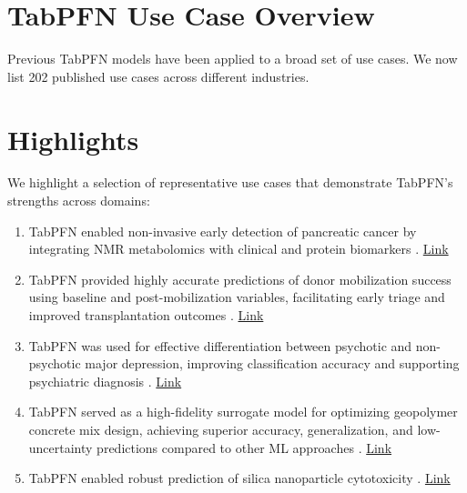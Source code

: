 \section{TabPFN Use Case Overview}\label{app:use_cases}

Previous TabPFN models have been applied to a broad set of use cases. We now list 202 published use cases across different industries.

\section*{Highlights}

We highlight a selection of representative use cases that demonstrate TabPFN's strengths across domains:
\begin{enumerate}

\item TabPFN enabled non-invasive early detection of pancreatic cancer by integrating NMR metabolomics with clinical and protein biomarkers \cite{wu2026panmetai}.  \href{https://www.nature.com/articles/s41467-026-69426-9}{Link}



\item TabPFN provided highly accurate predictions of donor mobilization success using baseline and post-mobilization variables, facilitating early triage and improved transplantation outcomes \cite{adil2026deep}. \href{https://doi.org/10.1016/j.jtct.2026.02.016}{Link}



\item TabPFN was used for effective differentiation between psychotic and non-psychotic major depression, improving classification accuracy and supporting psychiatric diagnosis \cite{zheng2026differentiation}. \href{https://doi.org/10.1016/j.jad.2026.121454}{Link}

\item TabPFN served as a high-fidelity surrogate model for optimizing geopolymer concrete mix design, achieving superior accuracy, generalization, and low-uncertainty predictions compared to other ML approaches \cite{sichani2025machine}. \href{https://www.nature.com/articles/s41598-025-29088-x}{Link}


\item TabPFN enabled robust prediction of silica nanoparticle cytotoxicity \cite{zhang2025boosting}. \href{https://www.nature.com/articles/s41598-025-33872-0}{Link}




\end{enumerate}
